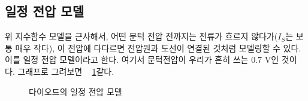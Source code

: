 \subsection{일정 전압 모델}
위 지수함수 모델을 근사해서, 어떤 문턱 전압 전까지는 전류가 흐르지 않다가($I_S$는 보통 매우 작다), 이 전압에 다다르면 전압원과 도선이 연결된 것처럼 모델링할 수 있다. 이를 일정 전압 모델이라고 한다.
여기서 문턱전압이 우리가 흔히 쓰는 0.7 V인 것이다. 그래프로 그려보면 \figurename~ \ref{fig:const voltage iv model}\과 같다.
\begin{figure}[!hbp]
    \centering
    \caption{다이오드의 일정 전압 모델}\label{fig:const voltage iv model}
\end{figure}